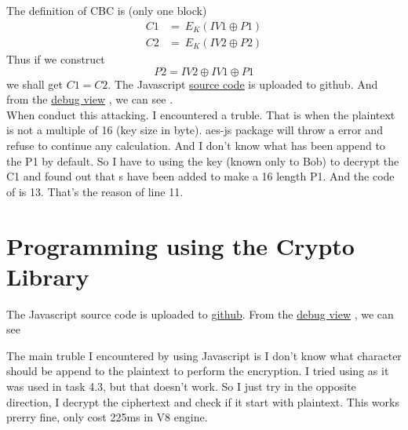 \documentclass{article}
\begin{document}
\subsection{}
The definition of CBC is (only one block)
$$
	\begin{aligned}
		C1 & =\ E_K(IV1\oplus P1) \\
		C2 & =\ E_K(IV2\oplus P2)
	\end{aligned}
$$
Thus if we construct
$$P2 = IV2 \oplus IV1 \oplus P1$$
we shall get $C1 = C2$. The Javascript
\href{https://github.com/Luna1996/WUSTL/blob/master/571/L2/task43.js}{source code}
is uploaded to github. And from the
\href{https://i.loli.net/2018/09/25/5ba9d18306d92.png}{debug view}
, we can see .\\
When conduct this attacking. I encountered a truble. That is when the plaintext is not a multiple of 16 (key size in byte). aes-js package will throw a error and refuse to continue any calculation. And I don't know what has been append to the P1 by default. So I have to using the key (known only to Bob) to decrypt the C1 and found out that s have been added to make a 16 length P1. And the code of  is 13. That's the reason of line 11.

\section{Programming using the Crypto Library}
The Javascript source code is uploaded to 
\href{https://github.com/Luna1996/WUSTL/blob/master/571/L2/task5.js}{github}. From the
\href{https://i.loli.net/2018/09/25/5ba9dc456b4f4.png}{debug view}
, we can see
\begin{center}
\end{center}
The main truble I encountered by using Javascript is I don't know what character should be append to the plaintext to perform the encryption. I tried using  as it was used in task 4.3, but that doesn't work. So I just try in the opposite direction, I decrypt the ciphertext and check if it start with plaintext. This works prerry fine, only cost 225ms in V8 engine.
\end{document}
